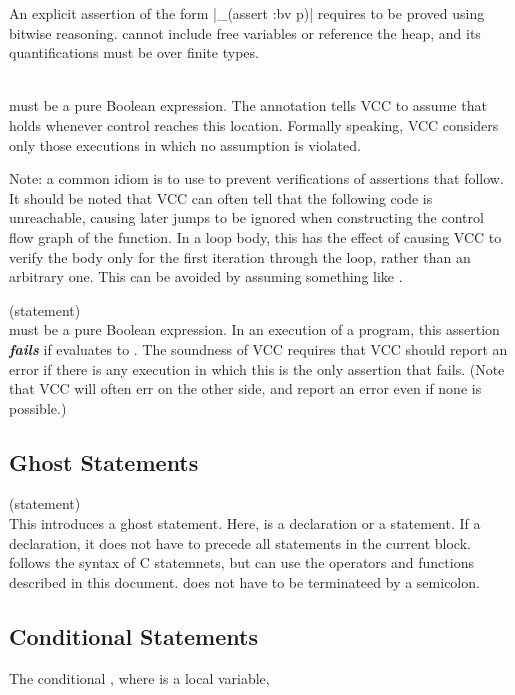\documentclass[preprint,nocopyrightspace]{sigplanconf}
\newcommand{\Def}[1]{\textit{\textbf{#1}}}
\begin{document}
{{{{\begin{VCC}
An explicit assertion of the form \vcc|_(assert {:bv} p)|
requires  to be proved using bitwise reasoning. 
cannot include free variables or reference the heap, and its
quantifications must be over finite types.

\\
 must be a pure Boolean
expression. The annotation tells VCC to assume that  holds
whenever control reaches this location. Formally speaking, VCC
considers only those executions in which no assumption is violated.

Note: a common idiom is to use  to prevent
verifications of assertions that follow. It should be noted that VCC
can often tell that the following code is unreachable, causing later
jumps to be ignored when constructing the control flow graph of the
function. In a loop body, this has the effect of causing VCC to verify
the body only for the first iteration through the loop, rather than an
arbitrary one. This can be avoided by assuming something like 
.

 (statement)\\
 must be a pure Boolean
expression. In an execution of a program, this assertion \Def{fails}
if  evaluates to . The soundness of VCC requires that
VCC should report an error if there is any execution in which this is
the only assertion that fails. (Note that VCC will often err on the
other side, and report an error even if none is possible.)

\subsection{Ghost Statements}
 (statement)\\
This introduces a ghost statement.
Here,  is a declaration or a statement. If a declaration,
it does not have to precede all statements in the current block.
 follows the syntax of C statemnets, but can use the
operators and functions described in this document.  does
not have to be terminateed by a semicolon.

\subsection{Conditional Statements}
The conditional , where  is a local
variable,


\end{VCC}}}}}
\end{document}
